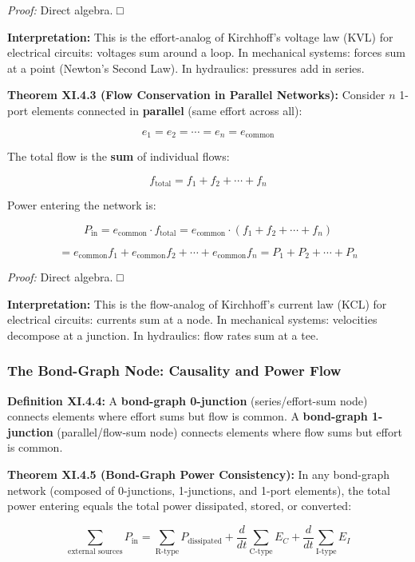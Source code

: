 \documentclass[
]{article}
\begin{document}
\emph{Proof:} Direct algebra. □

\textbf{Interpretation:} This is the effort-analog of Kirchhoff's
voltage law (KVL) for electrical circuits: voltages sum around a loop.
In mechanical systems: forces sum at a point (Newton's Second Law). In
hydraulics: pressures add in series.

\textbf{Theorem XI.4.3 (Flow Conservation in Parallel Networks):}
Consider \(n\) 1-port elements connected in \textbf{parallel} (same
effort across all):

\[e_1 = e_2 = \cdots = e_n = e_{\text{common}}\]

The total flow is the \textbf{sum} of individual flows:

\[f_{\text{total}} = f_1 + f_2 + \cdots + f_n\]

Power entering the network is:

\[P_{\text{in}} = e_{\text{common}} \cdot f_{\text{total}} = e_{\text{common}} \cdot (f_1 + f_2 + \cdots + f_n)\]

\[= e_{\text{common}} f_1 + e_{\text{common}} f_2 + \cdots + e_{\text{common}} f_n = P_1 + P_2 + \cdots + P_n\]

\emph{Proof:} Direct algebra. □

\textbf{Interpretation:} This is the flow-analog of Kirchhoff's current
law (KCL) for electrical circuits: currents sum at a node. In mechanical
systems: velocities decompose at a junction. In hydraulics: flow rates
sum at a tee.

\subsubsection{The Bond-Graph Node: Causality and Power
Flow}\label{the-bond-graph-node-causality-and-power-flow}

\textbf{Definition XI.4.4:} A \textbf{bond-graph 0-junction}
(series/effort-sum node) connects elements where effort sums but flow is
common. A \textbf{bond-graph 1-junction} (parallel/flow-sum node)
connects elements where flow sums but effort is common.

\textbf{Theorem XI.4.5 (Bond-Graph Power Consistency):} In any
bond-graph network (composed of 0-junctions, 1-junctions, and 1-port
elements), the total power entering equals the total power dissipated,
stored, or converted:

\[\sum_{\text{external sources}} P_{\text{in}} = \sum_{\text{R-type}} P_{\text{dissipated}} + \frac{d}{dt}\sum_{\text{C-type}} E_C + \frac{d}{dt}\sum_{\text{I-type}} E_I\]
\end{document}
